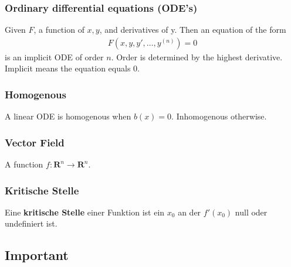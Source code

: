 \documentclass[8pt]{extarticle}
\newcommand{\R}{{\mathbb R}}
\newcommand{\ra}{{\rightarrow}}
\def\R{\mathbf{R}}
\begin{document}
\begin{multicols*}{3}
  \subsubsection{Ordinary differential equations (ODE's)}
  Given $F$, a function of $x, y$, and derivatives of y.
  Then an equation of the form
  \begin{align*}
    F(x, y, y', \dots, y^{(n)}) = 0
  \end{align*}
  is an implicit ODE of order $n$. Order is determined
  by the highest derivative. Implicit means the
  equation equals $0$.

\subsubsection{Homogenous}
A linear ODE is homogenous when $b(x) = 0$.
Inhomogenous otherwise.

  \subsubsection{Vector Field}
  A function $f: \R^n \ra \R^n$.

    \subsubsection {Kritische Stelle}
  Eine \textbf{kritische Stelle} einer Funktion ist ein $x_0$ an der $f'(x_0)$ null
  oder undefiniert ist.

\subsection{Important}


\end{multicols*}
\end{document}
